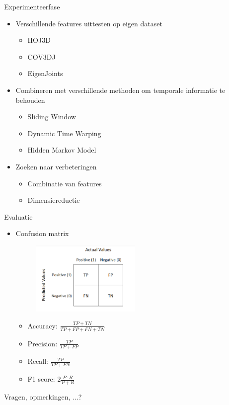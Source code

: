 \documentclass[]{beamer}
\begin{document}
	\begin{frame}{Experimenteerfase}
	\begin{itemize}
		\item Verschillende features uittesten op eigen dataset
		\begin{itemize}
			\item HOJ3D
			\item COV3DJ
			\item EigenJoints
		\end{itemize}
		\item Combineren met verschillende methoden om temporale informatie te behouden
		\begin{itemize}
			\item Sliding Window
			\item Dynamic Time Warping
			\item Hidden Markov Model
		\end{itemize}
		\item Zoeken naar verbeteringen
		\begin{itemize}
			\item Combinatie van features
			\item Dimensiereductie
		\end{itemize}
	\end{itemize}
	\end{frame}
	\begin{frame}{Evaluatie}
	\begin{itemize}
		\item Confusion matrix
		\begin{figure}
			\includegraphics[width=0.5\textwidth]{confusionmatrix}
		\end{figure}
		\begin{itemize}
			\item Accuracy: $\frac{TP + TN}{TP + FP + FN + TN}$
			\item Precision: $\frac{TP}{TP + FP}$
			\item Recall: $\frac{TP}{TP + FN}$
			\item F1 score: $2\frac{P\cdot R}{P + R}$
		\end{itemize}
	\end{itemize}
	\end{frame}
	\begin{frame}
		\begin{center}
			\Huge Vragen, opmerkingen, ...?
		\end{center}
	\end{frame}
\end{document}

